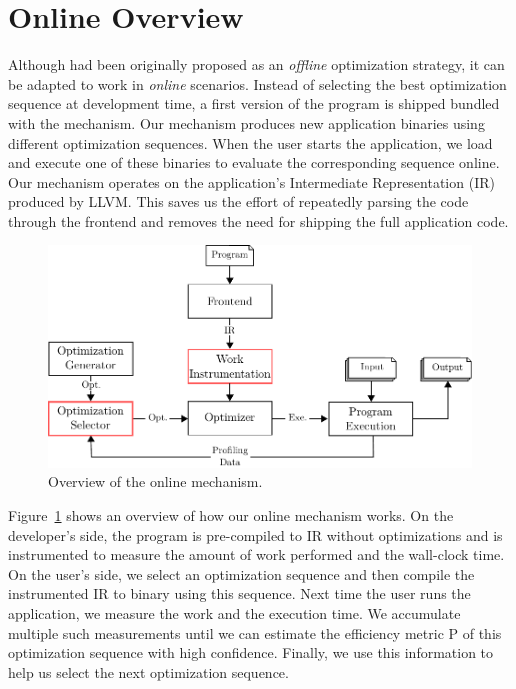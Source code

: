 \section{Online {\IterComp} Overview} \label{sec:oic-infra}

Although {\itercomp} had been originally proposed as an \textit{offline} optimization strategy, it can be adapted to work in
\textit{online} scenarios. Instead of selecting the best optimization sequence at development time, a first version of the program is
shipped bundled with the {\itercomp} mechanism. Our mechanism produces new application binaries using different optimization sequences.
When the user starts the application, we load and execute one of these binaries to evaluate the corresponding sequence online. Our
mechanism operates on the application's Intermediate Representation (IR) produced by LLVM. This saves us the effort of repeatedly parsing
the code through the frontend and removes the need for shipping the full application code.

\begin{figure}[t]
    \centering
    \includegraphics[width=\linewidth]{figs/infra-diagram}
    \caption{Overview of the online \itercomp mechanism. }
    \label{fig:infra-diagram}
\end{figure}

Figure~\ref{fig:infra-diagram} shows an overview of how our online {\itercomp} mechanism works. On the developer's side, the program is
pre-compiled to IR without optimizations and is instrumented to measure the amount of work performed and the wall-clock time. On the user's
side, we select an optimization sequence and then compile the instrumented IR to binary using this sequence. Next time the user runs the
application, we measure the work and the execution time. We accumulate multiple such measurements until we can estimate the efficiency
metric P of this optimization sequence with high confidence. Finally, we use this information to help us select the next optimization
sequence.

